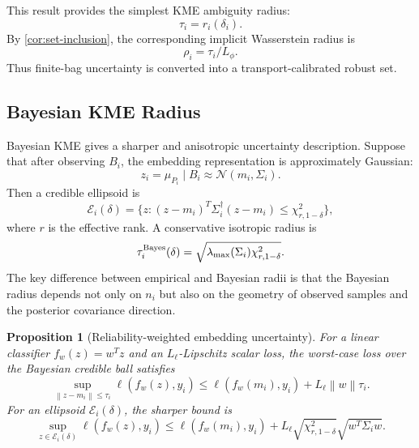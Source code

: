 \documentclass[10pt,journal]{IEEEtran}
\newtheorem{proposition}{Proposition}
\newcommand{\norm}[1]{\left\lVert #1 \right\rVert}
\begin{document}
This result provides the simplest KME ambiguity radius:
\begin{equation}
    \tau_i=r_i(\delta_i).
\end{equation}
By \cref{cor:set-inclusion}, the corresponding implicit Wasserstein radius is
\begin{equation}
    \rho_i=\tau_i/L_\phi.
\end{equation}
Thus finite-bag uncertainty is converted into a transport-calibrated robust set.

\subsection{Bayesian KME Radius}

Bayesian KME gives a sharper and anisotropic uncertainty description. Suppose that after observing $B_i$, the embedding representation is approximately Gaussian:
\begin{equation}
    z_i=\mu_{P_i}\mid B_i\approx \mathcal{N}(m_i,\Sigma_i).
\end{equation}
Then a credible ellipsoid is
\begin{equation}
    \mathcal{E}_i(\delta)=\{z:(z-m_i)^T\Sigma_i^\dagger(z-m_i)\le \chi^2_{r,1-\delta}\},
\end{equation}
where $r$ is the effective rank. A conservative isotropic radius is
\begin{equation}
\label{eq:bayes-radius}
    \tau_i^{\rm Bayes}(\delta)=\sqrt{\lambda_{\max}(\Sigma_i)\chi^2_{r,1-\delta}}.
\end{equation}
The key difference between empirical and Bayesian radii is that the Bayesian radius depends not only on $n_i$ but also on the geometry of observed samples and the posterior covariance direction.

\begin{proposition}[Reliability-weighted embedding uncertainty]
\label{prop:bayes-radius}
For a linear classifier $f_w(z)=w^Tz$ and an $L_\ell$-Lipschitz scalar loss, the worst-case loss over the Bayesian credible ball satisfies
\begin{equation}
\label{eq:linear-robust}
    \sup_{\norm{z-m_i}\le \tau_i}\ell(f_w(z),y_i)
    \le \ell(f_w(m_i),y_i)+L_\ell\norm{w}\tau_i.
\end{equation}
For an ellipsoid $\mathcal{E}_i(\delta)$, the sharper bound is
\begin{equation}
    \sup_{z\in\mathcal{E}_i(\delta)}\ell(f_w(z),y_i)
    \le \ell(f_w(m_i),y_i)+L_\ell\sqrt{\chi^2_{r,1-\delta}}\sqrt{w^T\Sigma_i w}.
\end{equation}
\end{proposition}
\end{document}
